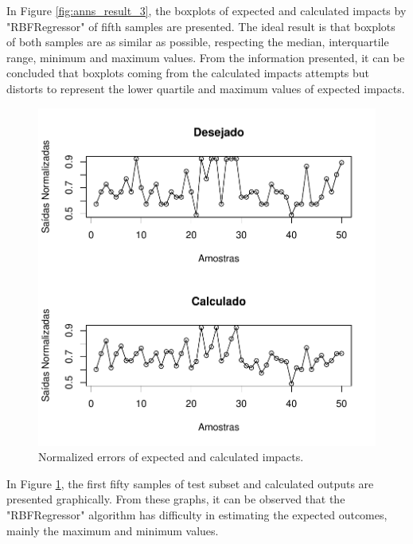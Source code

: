 In Figure \ref{fig:anns_result_3}, the boxplots of expected and calculated impacts by "RBFRegressor" of fifth samples are presented. The ideal result is that boxplots of both samples are as similar as possible, respecting the median, interquartile range, minimum and maximum values. From the information presented, it can be concluded that boxplots coming from the calculated impacts attempts but distorts to represent the lower quartile and maximum values of expected impacts. 

\begin{figure}[!h]
  \vspace{-0.2cm}
  \centering
  \includegraphics[width=0.7\columnwidth]{image/rbfreg_ex4_2.pdf}
  \caption{Normalized errors of expected and calculated impacts.}
  \label{fig:anns_result_4}
\end{figure}

In Figure \ref{fig:anns_result_4}, the first fifty samples of test subset and calculated outputs are presented graphically. From these graphs, it can be observed that the "RBFRegressor" algorithm has difficulty in estimating the expected outcomes, mainly the maximum and minimum values.

